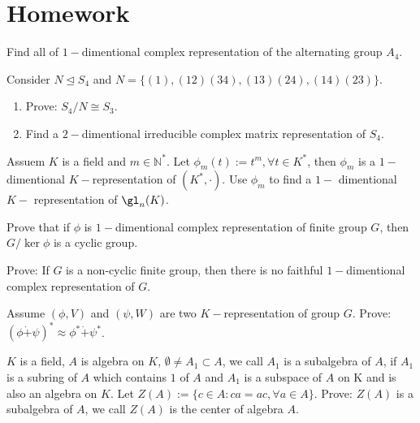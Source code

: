 \documentclass{ctexart}
\newif\ifpreface
\begin{document}
\large
\setlength{\baselineskip}{1.2em}
\ifpreface

\else
\maketitle
\fi
{}
\iffalse
\section{Homework}
\begin{problem}
Find all of $1-$dimentional complex representation of the alternating group $A_4$.
\end{problem}



\begin{problem}\label{pro:2}
Consider $N\trianglelefteq S_4$ and $N=\{(1),(12)(34),(13)(24),(14)(23)\}$.
\begin{enumerate}
\item Prove: $S_4/N\cong S_3$.
\item Find a $2-$dimentional irreducible complex matrix representation of $S_4$.
\end{enumerate}
\end{problem}


\begin{problem}
Assuem $K$ is a field and $m\in \mathbb{N}^*$. Let $\phi_m(t):=t^m,\forall t\in K^*$, then $\phi_m$ is a $1-$dimentional $K-$representation of $(K^*,\cdot)$. Use $\phi_m$ to find a $1-$ dimentional $K-$ representation of $\gl_n(K)$.
\end{problem}


\begin{problem}\label{pro:4}
Prove that if $\phi$ is $1-$dimentional complex representation of finite group $G$, then $G/\ker\phi$ is a cyclic group.
\end{problem}


\begin{problem}
Prove: If $G$ is a non-cyclic finite group, then there is no faithful $1-$dimentional complex representation of $G$.
\end{problem}


\begin{problem}
Assume $(\phi,V)$ and $(\psi,W)$ are two $K-$representation of group $G$.
Prove: $(\phi \dot{+}\psi)^*\approx \phi^*\dot{+}\psi^*$.
\end{problem}



\begin{problem}
$K$ is a field, $A$ is algebra on $K$, $\emptyset\neq A_1\subset A$, we call $A_1$ is a subalgebra of $A$, if $A_1$ is a subring of $A$ which contains $1$ of $A$ and $A_1$ is a subspace of $A$ on K and is also an algebra on $K$. Let $Z(A):=\{c\in A:ca=ac,\forall a\in A\}$. Prove: $Z(A)$ is a subalgebra of $A$, we call $Z(A)$ is the center of algebra $A$.
\end{problem}
\end{document}
